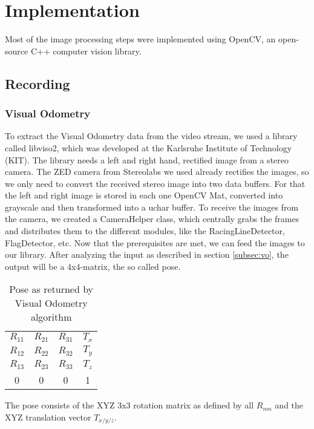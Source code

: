 \section{Implementation}
\label{sec:implementation}

Most of the image processing steps were implemented using OpenCV, an open-source C++ computer vision library. 

\subsection{Recording}
\subsubsection{Visual Odometry}
To extract the Visual Odometry data from the video stream, we used a library called libviso2, which was developed at the Karlsruhe Institute of Technology (KIT). The library needs a left and right hand, rectified image from a stereo camera. The ZED camera from Stereolabs we used already rectifies the images, so we only need to convert the received stereo image into two data buffers.
For that the left and right image is stored in each one OpenCV Mat, converted into grayscale and then transformed into a uchar buffer.
To receive the images from the camera, we created a CameraHelper class, which centrally grabs the frames and distributes them to the different modules, like the RacingLineDetector, FlagDetector, etc.
Now that the prerequisites are met, we can feed the images to our library.
After analyzing the input as described in section \ref{subsec:vo}, the output will be a 4x4-matrix, the so called pose.

\begin{table}[!ht]
 \begin{center}
  \begin{tabular}{c c c c}
   $R_{11}$ & $R_{21}$ & $R_{31}$ & $T_{x}$\\
   $R_{12}$ & $R_{22}$ & $R_{32}$ & $T_{y}$\\
   $R_{13}$ & $R_{23}$ & $R_{33}$ & $T_{z}$\\
   0 & 0 & 0 & 1
  \end{tabular}
 \end{center}
 \caption{Pose as returned by Visual Odometry algorithm}
\end{table}

The pose consists of the XYZ 3x3 rotation matrix as defined by all $R_{nm}$ and the XYZ translation vector $T_{x/y/z}$. 

